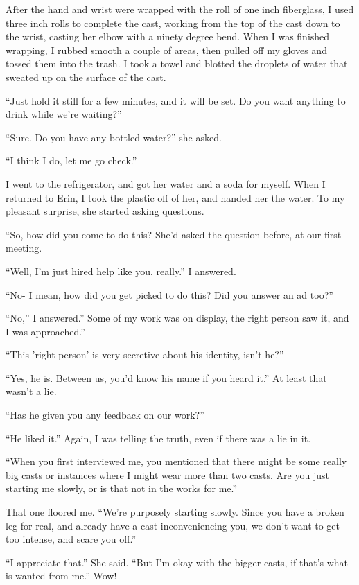 After the hand and wrist were wrapped with the roll of one inch fiberglass, I used three
inch rolls to complete the cast, working from the top of the cast down to the wrist, casting her
elbow with a ninety degree bend. When I was finished wrapping, I rubbed smooth a couple of
areas, then pulled off my gloves and tossed them into the trash. I took a towel and blotted the
droplets of water that sweated up on the surface of the cast.

``Just hold it still for a few minutes, and it will be set. Do you want anything to drink
while we're waiting?''

``Sure. Do you have any bottled water?'' she asked.

``I think I do, let me go check.''

I went to the refrigerator, and got her water and a soda for myself. When I returned to
Erin, I took the plastic off of her, and handed her the water. To my pleasant surprise, she
started asking questions.

``So, how did you come to do this? She'd asked the question before, at our first meeting.

``Well, I'm just hired help like you, really.'' I answered.

``No- I mean, how did you get picked to do this? Did you answer an ad too?''

``No,'' I answered.'' Some of my work was on display, the right person saw it, and I was
approached.''

``This 'right person' is very secretive about his identity, isn't he?''

``Yes, he is. Between us, you'd know his name if you heard it.'' At least that wasn't a lie.

``Has he given you any feedback on our work?''

``He liked it.'' Again, I was telling the truth, even if there was a lie in it.

``When you first interviewed me, you mentioned that there might be some really big casts or
instances where I might wear more than two casts. Are you just starting me slowly, or is that
not in the works for me.''

That one floored me. ``We're purposely starting slowly. Since you have a broken leg for
real, and already have a cast inconveniencing you, we don't want to get too intense, and scare
you off.''

``I appreciate that.'' She said. ``But I'm okay with the bigger casts, if that's what is
wanted from me.'' Wow!

